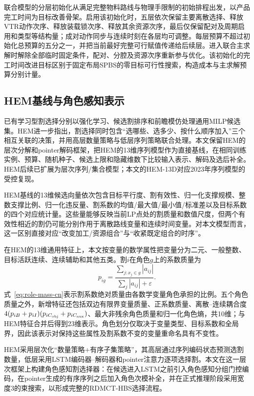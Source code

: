 \documentclass[final,5p,times,twocolumn]{elsarticle}
\begin{document}
联合模型的分层初始化从满足完整物料路线与物理手限制的初始排程出发，以产品完工时间为目标改善骨架。启用该初始化时，五层依次保留主要离散选择、释放VTR动作次序、释放装载锁次序、释放其余资源次序，最后仅保留配对及周期启用和类型等结构量；成对动作同步与连续时刻在各层均可调整。每层预算不超过初始化总预算的五分之一，并把当前最好完整可行赋值传递给后续层。进入联合主求解时解除全部临时固定条件，配对、分腔及资源次序重新参与优化。该初始化的完工时间改进目标区别于固定布局SPBS的零目标可行性搜索，构造成本与主求解预算分别计量。

\subsection{HEM基线与角色感知表示}

已有学习型割选择分别以强化学习、候选割排序和前瞻模仿处理通用MILP候选集\citep{tang2020cut,huang2022cutranking,paulus2022looking}。HEM进一步指出，割选择同时包含“选哪些、选多少、按什么顺序加入”三个相互关联的决策，并用高层数量策略与低层序列策略联合处理\citep{wang2023hem}。本文保留HEM的层次分解和pointer解码框架，把HEM的13维序列模型作为直接基线，在相同训练实例、预算、随机种子、候选上限和隐藏维数下比较输入表示、解码及选后补全。HEM后续已扩展为层次序列/集合模型\citep{wang2024hemset}；本文的HEM-13D对应2023年序列模型的受控复现。

HEM基线的13维候选向量依次包含目标平行度、割有效性、归一化支撑规模、整数支撑比例、归一化违反量、割系数的均值/最大值/最小值/标准差以及目标系数的四个对应统计量。这些量能够反映当前LP点处的割质量和数值尺度，但两个有效性相近的割仍可能分别作用于离散路线变量和连续时间变量。对本文模型而言，这一区别直接对应“改变加工/资源组合”与“收紧既定组合的时序”。

在HEM的13维通用特征上，本文按变量的数学属性把变量分为二元、一般整数、目标活跃连续、连续辅助和其他五类。割$i$在角色$g$上的系数质量为
\begin{equation}
p_{ig}=\frac{\sum_{j:x_j\in g}|a_{ij}|}{\sum_j|a_{ij}|+\varepsilon}.
\label{eq:role-mass-cn}
\end{equation}
式~\eqref{eq:role-mass-cn}表示割系数绝对质量由各数学变量角色承担的比例。五个角色质量之外，新增特征还包括双边有限界变量质量、正系数质量、离散--连续耦合度$4(p_{iB}+p_{iI})(p_{iC_{\rm obj}}+p_{iC_{\rm aux}})$、最大非残余角色质量和归一化角色熵，共10维；与HEM特征合并后得到23维表示。角色划分仅取决于变量类型、目标系数和全局界，因此该表示对保持这些属性及割系数不变的变量重命名具有不变性。

HEM采用层次化“数量策略+有序子集策略”，其高层通过序列编码状态预测选割数量，低层采用LSTM编码器--解码器和pointer注意力逐项选择割\citep{wang2023hem,vinyals2015pointer}。本文在这一层次框架上构建角色感知割选择器：在候选进入LSTM之前引入角色感知分组门控编码，在pointer生成的有序序列之后加入角色次模补全，并在正式推理阶段采用宽度3的束搜索，以形成完整的RDMCT-HBS选择流程。
\end{document}
